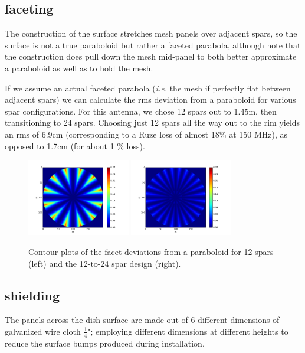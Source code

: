 \documentclass[preprint]{aastex}  %
\begin{document}
\subsection{faceting}
The construction of the surface stretches mesh panels over adjacent spars, so the surface is not a true paraboloid but rather a faceted parabola, although note that the construction does pull down the mesh mid-panel to both better approximate a paraboloid as well as to hold the mesh.

If we assume an actual faceted parabola ({\em i.e.} the mesh if perfectly flat between adjacent spars) we can calculate the rms deviation from a paraboloid for various spar configurations.  For this antenna, we chose 12 spars out to 1.45m, then transitioning to 24 spars.  Choosing just 12 spars all the way out to the rim yields an rms of 6.9cm (corresponding to a Ruze loss of almost 18\% at 150 MHz), as opposed to 1.7cm (for about 1 \% loss).

\begin{figure}[H]
	\begin{center}
	\includegraphics[width =0.4\textwidth]{dish_plots/12spar.png}
	\includegraphics[width = 0.4\textwidth]{dish_plots/special_spar.png}
	\caption{Contour plots of the facet deviations from a paraboloid for 12 spars (left) and the 12-to-24 spar design (right).
\label{Fig:facets} }
	\end{center}
\end{figure}

\subsection{shielding}
The panels across the dish surface are made out of 6 different dimensions of galvanized wire cloth $\frac{1}{4}$"; employing different dimensions at different heights to reduce the surface bumps produced during installation.
\end{document}
